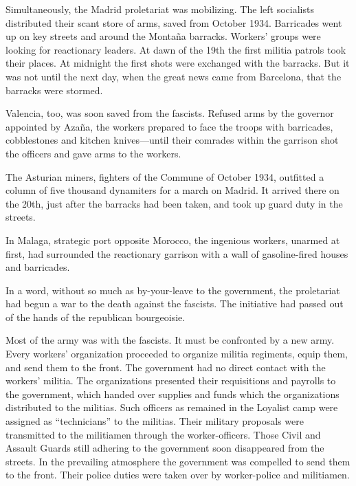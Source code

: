 Simultaneously, the Madrid proletariat was mobilizing. The left socialists distributed their scant store of arms, saved from October 1934. Barricades went up on key streets and around the Montaña barracks. Workers’ groups were looking for reactionary leaders. At dawn of the 19th the first militia patrols took their places. At midnight the first shots were exchanged with the barracks. But it was not until the next day, when the great news came from Barcelona, that the barracks were stormed.

Valencia, too, was soon saved from the fascists. Refused arms by the governor appointed by Azaña, the workers prepared to face the troops with barricades, cobblestones and kitchen knives—until their comrades within the garrison shot the officers and gave arms to the workers.

The Asturian miners, fighters of the Commune of October 1934, outfitted a column of five thousand dynamiters for a march on Ma\-drid. It arrived there on the 20th, just after the barracks had been taken, and took up guard duty in the streets.
\nowidow

In Malaga, strategic port opposite Morocco, the ingenious workers, unarmed at first, had surrounded the reactionary garrison with a wall of gasoline-fired houses and barricades.

In a word, without so much as by-your-leave to the government, the proletariat had begun a war to the death against the fascists. The initiative had passed out of the hands of the republican bourgeoisie.

Most of the army was with the fascists. It must be confronted by a new army. Every workers’ organization proceeded to organize militia regiments, equip them, and send them to the front. The government had no direct contact with the workers’ militia. The organizations presented their requisitions and payrolls to the government, which handed over supplies and funds which the organizations distributed to the militias. Such officers as remained in the Loyalist camp were assigned as ``technicians'' to the militias. Their military proposals were transmitted to the militiamen through the worker-officers. Those Civil and Assault Guards still adhering to the government soon disappeared from the streets. In the prevailing atmosphere the government was compelled to send them to the front. Their police duties were taken over by worker-police and militiamen.

